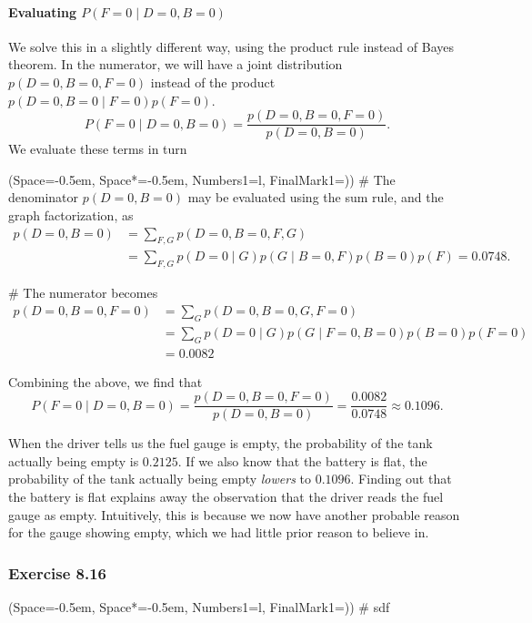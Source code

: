 \documentclass[12pt, a4paper]{article}
\newcommand{\listSpace}{-0.5em}%
\begin{document}
\paragraph{Evaluating $P(F=0 \mid D = 0, B=0)$}
We solve this in a slightly different way, using the product rule instead of Bayes theorem.
In the numerator, we will have a joint distribution $p(D = 0, B=0, F =0)$ instead of the product $p(D = 0, B=0 \mid F =0) p(F =0)$.
\begin{equation*}
P(F=0 \mid D = 0, B=0) = \frac{p(D = 0, B=0, F =0)}{p( D = 0, B=0)}.
\end{equation*}
We evaluate these terms in turn
\begin{easylist}[enumerate]
	\ListProperties(Space=\listSpace, Space*=\listSpace, Numbers1=l, FinalMark1={)})
	# The denominator $p( D = 0, B=0)$ may be evaluated using the sum rule, and the graph factorization, as
	\begin{align*}
	p( D = 0, B=0) &= \sum_{F, G} p( D = 0, B = 0, F, G) \\
	&= \sum_{F, G} p( D = 0 \mid G) p( G \mid B = 0, F) p(B=0) p (F)
	= 0.0748.
	\end{align*}

	
	# The numerator becomes
	\begin{align*}
	p(D = 0, B=0, F =0) 
	&= \sum_{G} p(D=0, B=0, G, F = 0) \\
	&= \sum_{G} p(D = 0 \mid G) p(G \mid F =0, B=0) p(B=0) p(F=0) \\
	&= 0.0082
	\end{align*}
\end{easylist}
Combining the above, we find that
\begin{equation*}
P(F=0 \mid D = 0, B=0) = \frac{p(D = 0, B=0, F =0)}{p( D = 0, B=0)}
=
\frac{0.0082}{0.0748} \approx 0.1096.
\end{equation*}

When the driver tells us the fuel gauge is empty, the probability of the tank actually being empty is $0.2125$.
If we also know that the battery is flat, the probability of the tank actually being empty \emph{lowers} to $0.1096$.
Finding out that the battery is flat explains away the observation that the driver reads the fuel gauge as empty.
Intuitively, this is because we now have another probable reason for the gauge showing empty, which we had little prior reason to believe in.




\subsubsection*{Exercise 8.16}
\begin{easylist}[enumerate]
	\ListProperties(Space=\listSpace, Space*=\listSpace, Numbers1=l, FinalMark1={)})
	# sdf
\end{easylist}
\end{document}

